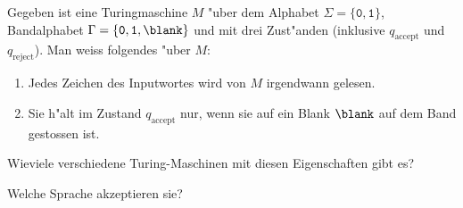 Gegeben ist eine Turingmaschine $M$ "uber dem Alphabet
$\Sigma=\{\texttt{0}, \texttt{1}\}$,
Bandalphabet
$\Gamma=\{\texttt{0}, \texttt{1}, \blank\}$
und mit drei Zust"anden
(inklusive $q_{\text{accept}}$ und $q_{\text{reject}}$).
Man weiss folgendes "uber $M$:
\begin{enumerate}
\item\label{50000019:liestalles} Jedes Zeichen des Inputwortes wird
von $M$ irgendwann gelesen.
\item\label{50000019:haeltaufblank} Sie h"alt im Zustand $q_{\text{accept}}$
nur, wenn sie auf ein Blank $\blank$ auf dem Band gestossen ist.
\end{enumerate}
\begin{teilaufgaben}
\item
Wieviele verschiedene Turing-Maschinen mit diesen Eigenschaften gibt es?
\item
Welche Sprache akzeptieren sie?
\end{teilaufgaben}

